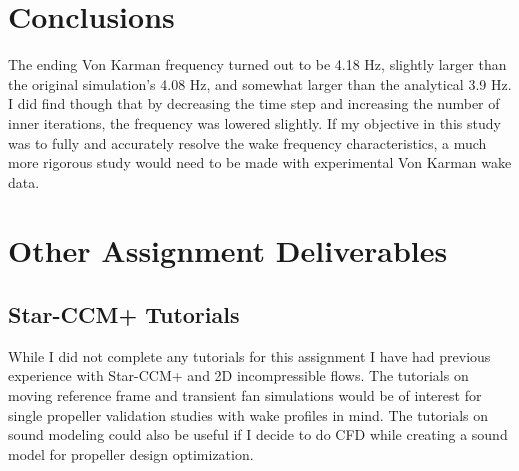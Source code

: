 \documentclass[10pt,english]{article}
\begin{document}
\section{Conclusions}
The ending Von Karman frequency turned out to be 4.18 Hz, slightly larger than the original simulation's 4.08 Hz, and somewhat larger than the analytical 3.9 Hz.  I did find though that by decreasing the time step and increasing the number of inner iterations, the frequency was lowered slightly.  If my objective in this study was to fully and accurately resolve the wake frequency characteristics, a much more rigorous study would need to be made with experimental Von Karman wake data.

\section{Other Assignment Deliverables}
\subsection{Star-CCM+ Tutorials}

   While I did not complete any tutorials for this assignment I have had previous experience with Star-CCM+ and 2D incompressible flows.  The tutorials on moving reference frame and transient fan simulations would be of interest for single propeller validation studies with wake profiles in mind.  The tutorials on sound modeling could also be useful if I decide to do CFD while creating a sound model for propeller design optimization.  
\end{document}
